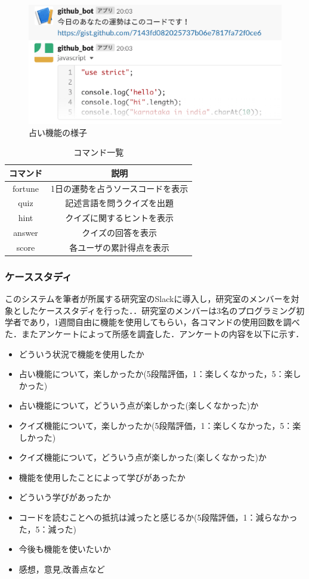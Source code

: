 \begin{figure}[!h]
  \begin{center}
    \includegraphics[width=0.6\linewidth]{image/prototype_fortune.eps}
  \end{center}
    \vspace{-8mm} 
  \caption{占い機能の様子}
  \label{prototype_fortune}
\end{figure}

\begin{table}[h]
  \centering
    \caption{コマンド一覧}
      \begin{tabular}{|c|c|} \hline
        コマンド & 説明 \\ \hline \hline
        fortune & 1日の運勢を占うソースコードを表示 \\ \hline
        quiz & 記述言語を問うクイズを出題 \\ \hline
        hint & クイズに関するヒントを表示 \\ \hline
        answer & クイズの回答を表示 \\ \hline
        score & 各ユーザの累計得点を表示 \\ \hline
      \end{tabular}
    \label{function}
  \end{table}

\subsubsection{ケーススタディ}
このシステムを筆者が所属する研究室のSlackに導入し，研究室のメンバーを対象としたケーススタディを行った．．研究室のメンバーは3名のプログラミング初学者であり，1週間自由に機能を使用してもらい，各コマンドの使用回数を調べた．またアンケートによって所感を調査した．アンケートの内容を以下に示す．

\begin{itemize}
  \item どういう状況で機能を使用したか
  \item 占い機能について，楽しかったか(5段階評価，1：楽しくなかった，5：楽しかった)
  \item 占い機能について，どういう点が楽しかった(楽しくなかった)か
  \item クイズ機能について，楽しかったか(5段階評価，1：楽しくなかった，5：楽しかった)
  \item クイズ機能について，どういう点が楽しかった(楽しくなかった)か
  \item 機能を使用したことによって学びがあったか
  \item どういう学びがあったか
  \item コードを読むことへの抵抗は減ったと感じるか(5段階評価，1：減らなかった，5：減った)
  \item 今後も機能を使いたいか
  \item 感想，意見,改善点など
\end{itemize}

